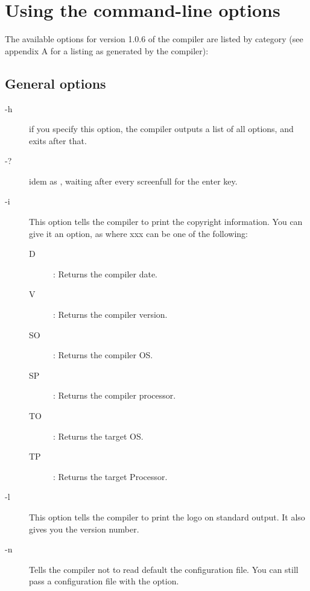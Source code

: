 \section{Using the command-line options}

The available options for version 1.0.6 of the compiler are listed by
category (see appendix A for a listing as generated by the compiler):

%
%

\subsection{General options}
\begin{description}
\item[-h] if you specify this option, the compiler outputs a list of all options,
and exits after that.
\item[-?] idem as , waiting after every screenfull for the enter key.
\item[-i] This option tells the compiler to print the copyright information.
 You can give it an option, as  where xxx can be one of the
following:
\begin{description}
\item[D] : Returns the compiler date.
\item[V] : Returns the compiler version.
\item[SO] : Returns the compiler OS.
\item[SP] : Returns the compiler processor.
\item[TO] : Returns the target OS.
\item[TP] : Returns the target Processor.
\end{description}
\item[-l] This option tells the compiler to print the \fpc logo on standard
output. It also gives you the \fpc version number.
\item [-n] Tells the compiler not to read default the configuration file.
You can still pass a configuration file with the  option.
\end{description}

%
%
